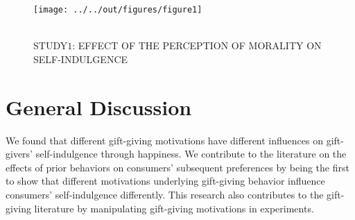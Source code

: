 \documentclass[11pt, a4paper, leqno]{article}
\begin{document}
\captionsetup[figure]{labelfont=bf,justification=centering}
\captionsetup[figure]{name=FIGURE}
\begin{figure}
\centering
\caption{\\STUDY$1$: EFFECT OF THE PERCEPTION OF MORALITY ON SELF-INDULGENCE}
\texttt{[image: ../../out/figures/figure1]}
\end{figure}




\section{General Discussion}
\setlength{\parindent}{2ex}
We found that different gift-giving motivations have different influences on gift-givers’ self-indulgence through happiness. We contribute to the literature on the effects of prior behaviors on consumers’ subsequent preferences by being the first to show that different motivations underlying gift-giving behavior influence consumers’ self-indulgence differently. This research also contributes to the gift-giving literature by manipulating gift-giving motivations in experiments. \par








 
\clearpage
{}
\printbibliography
{}

\end{document}
